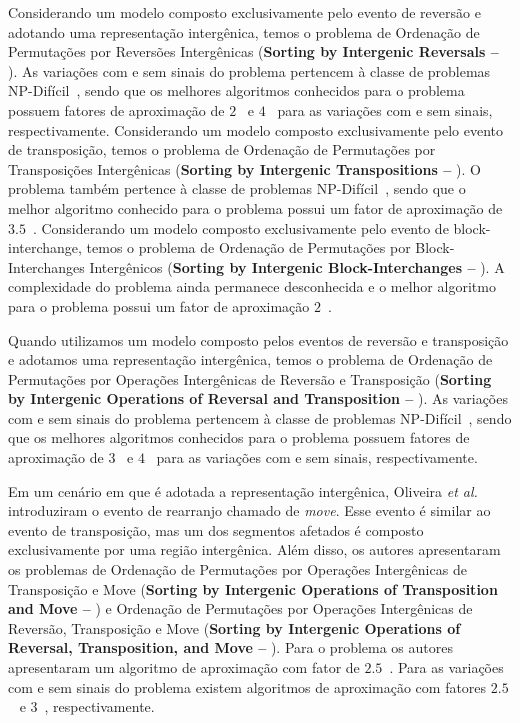 Considerando um modelo composto exclusivamente pelo evento de reversão e adotando uma representação intergênica, temos o problema de Ordenação de Permutações por Reversões Intergênicas (\textbf{Sorting by Intergenic Reversals --} \SbIR). As variações com e sem sinais do problema pertencem à classe de problemas NP-Difícil~\cite{2021b-oliveira-etal,2020a-brito-etal}, sendo que os melhores algoritmos conhecidos para o problema possuem fatores de aproximação de $2$~\cite{2021b-oliveira-etal} e $4$~\cite{2020a-brito-etal} para as variações com e sem sinais, respectivamente. Considerando um modelo composto exclusivamente pelo evento de transposição, temos o problema de Ordenação de Permutações por Transposições Intergênicas (\textbf{Sorting by Intergenic Transpositions --} \SbIT). O problema também pertence à classe de problemas NP-Difícil~\cite{2021a-oliveira-etal}, sendo que o melhor algoritmo conhecido para o problema possui um fator de aproximação de $3.5$~\cite{2021a-oliveira-etal}. Considerando um modelo composto exclusivamente pelo evento de block-interchange, temos o problema de Ordenação de Permutações por Block-Interchanges Intergênicos (\textbf{Sorting by Intergenic Block-Interchanges --} \SbIBI). A complexidade do problema ainda permanece desconhecida e o melhor algoritmo para o problema possui um fator de aproximação $2$~\cite{2019-dias-etal}.

Quando utilizamos um modelo composto pelos eventos de reversão e transposição e adotamos uma representação intergênica, temos o problema de Ordenação de Permutações por Operações Intergênicas de Reversão e Transposição (\textbf{Sorting by Intergenic Operations of Reversal and Transposition --} \SbIRT). As variações com e sem sinais do problema pertencem à classe de problemas NP-Difícil~\cite{2021a-oliveira-etal,2020a-brito-etal}, sendo que os melhores algoritmos conhecidos para o problema possuem fatores de aproximação de $3$~\cite{2021a-oliveira-etal} e $4$~\cite{2021b-brito-etal} para as variações com e sem sinais, respectivamente.

Em um cenário em que é adotada a representação intergênica, Oliveira \textit{et al.}~\cite{2021a-oliveira-etal} introduziram o evento de rearranjo chamado de \emph{move}. Esse evento é similar ao evento de transposição, mas um dos segmentos afetados é composto exclusivamente por uma região intergênica. Além disso, os autores apresentaram os problemas de Ordenação de Permutações por Operações Intergênicas de Transposição e Move (\textbf{Sorting by Intergenic Operations of Transposition and Move --} \SbITM) e Ordenação de Permutações por Operações Intergênicas de Reversão, Transposição e Move (\textbf{Sorting by Intergenic Operations of Reversal, Transposition, and Move --} \SbIRTM). Para o problema \SbITM{} os autores apresentaram um algoritmo de aproximação com fator de $2.5$~\cite{2021a-oliveira-etal}. Para as variações com e sem sinais do problema \SbIRTM{} existem algoritmos de aproximação com fatores $2.5$~\cite{2021a-oliveira-etal} e $3$~\cite{2021b-brito-etal}, respectivamente.  

